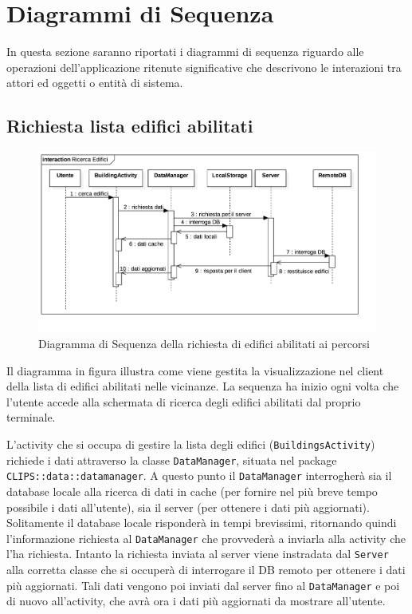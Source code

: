 \section{Diagrammi di Sequenza}
\label{sec:Diagrammi di Sequenza}

In questa sezione saranno riportati i diagrammi di sequenza riguardo alle operazioni dell'applicazione ritenute significative che descrivono le interazioni tra attori ed oggetti o entità di sistema.

\subsection{Richiesta lista edifici abilitati}
\label{sub:Richiesta lista edifici abilitati}

\begin{figure}[!h]
	\centering
   \includegraphics[scale=0.28]{img/diagrammiSequenza/ricercaEdifici.png}
   \caption{Diagramma di Sequenza della richiesta di edifici abilitati ai percorsi}
\end{figure}

Il diagramma in figura illustra come viene gestita la visualizzazione nel client della lista di edifici abilitati nelle vicinanze.
La sequenza ha inizio ogni volta che l'utente accede alla schermata di ricerca degli edifici abilitati dal proprio terminale.

L'activity che si occupa di gestire la lista degli edifici (\texttt{BuildingsActivity}) richiede i dati attraverso la classe \texttt{DataManager}, situata nel package \texttt{CLIPS::data::datamanager}.
A questo punto il \texttt{DataManager} interrogherà sia il database locale alla ricerca di dati in cache (per fornire nel più breve tempo possibile i dati all'utente), sia il server (per ottenere i dati più aggiornati).
Solitamente il database locale risponderà in tempi brevissimi, ritornando quindi l'informazione richiesta al \texttt{DataManager} che provvederà a inviarla alla activity che l'ha richiesta.
Intanto la richiesta inviata al server viene instradata dal \texttt{Server} alla corretta classe che si occuperà di interrogare il DB remoto per ottenere i dati più aggiornati.
Tali dati vengono poi inviati dal server fino al \texttt{DataManager} e poi di nuovo all'activity, che avrà ora i dati più aggiornati da mostrare all'utente.

